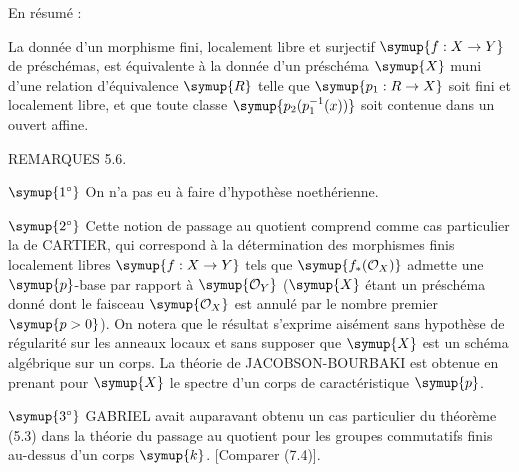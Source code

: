 En résumé :

 La donnée d'un morphisme fini, localement libre et
surjectif $\symup{f:X\to Y}$ de préschémas, est équivalente à la donnée d'un
préschéma $\symup{X}$ muni d'une relation d'équivalence $\symup{R}$ telle que $\symup{p_1:R\to X}$
soit fini et localement libre, et que toute classe $\symup{p_2(p_1^{-1}(x))}$ soit
contenue dans un ouvert affine.

\medskip
\noindent\textnormal{REMARQUES 5.6.}

\smallskip
\noindent $\symup{1^\circ}$ On n'a pas eu à faire d'hypothèse noethérienne.

\smallskip
\noindent $\symup{2^\circ}$ Cette notion de passage au quotient comprend comme cas
particulier la  de CARTIER, qui correspond à la
détermination des morphismes finis localement libres $\symup{f:X\to Y}$ tels que
$\symup{f_*(\mathcal O_X)}$ admette une $\symup{p}$-base par rapport à $\symup{\mathcal O_Y}$ ($\symup{X}$
étant un préschéma donné dont le faisceau $\symup{\mathcal O_X}$ est annulé par le
nombre premier $\symup{p>0}$). On notera que le résultat s'exprime aisément sans
hypothèse de régularité sur les anneaux locaux et sans supposer que $\symup{X}$ est un
schéma algébrique sur un corps. La théorie de JACOBSON-BOURBAKI est obtenue
en prenant pour $\symup{X}$ le spectre d'un corps de caractéristique $\symup{p}$.

\smallskip
\noindent $\symup{3^\circ}$ GABRIEL avait auparavant obtenu un cas particulier du
théorème (5.3) dans la théorie du passage au quotient pour les groupes
commutatifs finis au-dessus d'un corps $\symup{k}$. [Comparer (7.4)].


